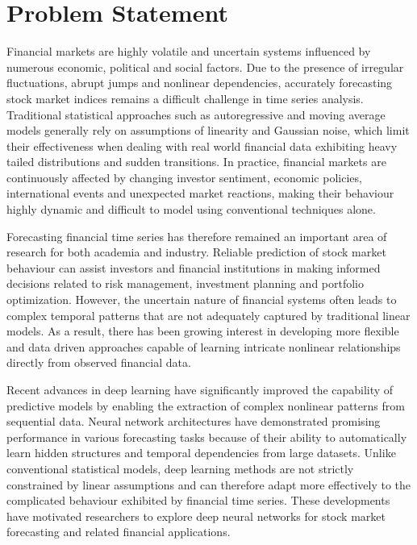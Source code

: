 \chapter{Problem Statement}

Financial markets are highly volatile and uncertain systems influenced by numerous economic, political and social factors. Due to the presence of irregular fluctuations, abrupt jumps and nonlinear dependencies, accurately forecasting stock market indices remains a difficult challenge in time series analysis. Traditional statistical approaches such as autoregressive and moving average models generally rely on assumptions of linearity and Gaussian noise, which limit their effectiveness when dealing with real world financial data exhibiting heavy tailed distributions and sudden transitions. In practice, financial markets are continuously affected by changing investor sentiment, economic policies, international events and unexpected market reactions, making their behaviour highly dynamic and difficult to model using conventional techniques alone.

Forecasting financial time series has therefore remained an important area of research for both academia and industry. Reliable prediction of stock market behaviour can assist investors and financial institutions in making informed decisions related to risk management, investment planning and portfolio optimization. However, the uncertain nature of financial systems often leads to complex temporal patterns that are not adequately captured by traditional linear models. As a result, there has been growing interest in developing more flexible and data driven approaches capable of learning intricate nonlinear relationships directly from observed financial data.

Recent advances in deep learning have significantly improved the capability of predictive models by enabling the extraction of complex nonlinear patterns from sequential data. Neural network architectures have demonstrated promising performance in various forecasting tasks because of their ability to automatically learn hidden structures and temporal dependencies from large datasets. Unlike conventional statistical models, deep learning methods are not strictly constrained by linear assumptions and can therefore adapt more effectively to the complicated behaviour exhibited by financial time series. These developments have motivated researchers to explore deep neural networks for stock market forecasting and related financial applications.

